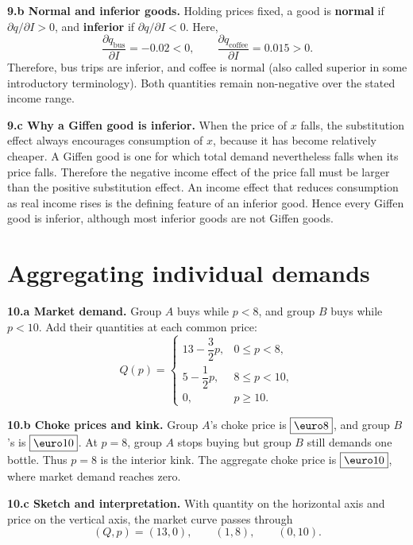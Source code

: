 \documentclass[11pt,a4paper]{article}
\begin{document}
\textbf{9.b Normal and inferior goods.} Holding prices fixed, a good is
\textbf{normal} if \(\partial q/\partial I>0\), and \textbf{inferior} if
\(\partial q/\partial I<0\). Here,
\[
  \frac{\partial q_{\mathrm{bus}}}{\partial I}=-0.02<0,
  \qquad
  \frac{\partial q_{\mathrm{coffee}}}{\partial I}=0.015>0.
\]
Therefore, bus trips are \(\boxed{\text{inferior}}\), and coffee is
\(\boxed{\text{normal}}\) (also called superior in some introductory
terminology). Both quantities remain non-negative over the stated income
range.

\textbf{9.c Why a Giffen good is inferior.} When the price of \(x\) falls,
the substitution effect always encourages consumption of \(x\), because it
has become relatively cheaper. A Giffen good is one for which total demand
nevertheless falls when its price falls. Therefore the negative income
effect of the price fall must be larger than the positive substitution
effect. An income effect that reduces consumption as real income rises is
the defining feature of an inferior good. Hence every Giffen good is
inferior, although most inferior goods are not Giffen goods.

\section{Aggregating individual demands}

\textbf{10.a Market demand.} Group \(A\) buys while \(p<8\), and group \(B\)
buys while \(p<10\). Add their quantities at each common price:
\[
  Q(p)=
  \begin{cases}
    13-\dfrac32p, & 0\leq p<8,\\[0.45em]
    5-\dfrac12p, & 8\leq p<10,\\[0.45em]
    0, & p\geq10.
  \end{cases}
\]

\textbf{10.b Choke prices and kink.} Group \(A\)'s choke price is
\(\boxed{\text{\euro}8}\), and group \(B\)'s is \(\boxed{\text{\euro}10}\). At
\(p=8\), group \(A\) stops buying but group \(B\) still demands one bottle.
Thus \(p=8\) is the interior kink. The aggregate choke price is
\(\boxed{\text{\euro}10}\), where market demand reaches zero.

\textbf{10.c Sketch and interpretation.} With quantity on the horizontal
axis and price on the vertical axis, the market curve passes through
\[
  (Q,p)=(13,0),\qquad (1,8),\qquad (0,10).
\]
\begin{center}
\end{center}
\end{document}
